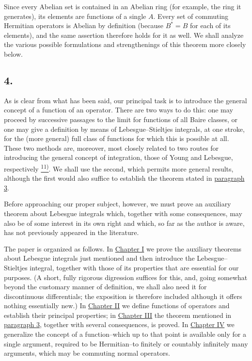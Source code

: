 \documentclass[12pt,b5paper,twoside]{article}
\newcommand{\noteref}[1]{%
  \hyperlink{note:#1}{\textsuperscript{#1)}}}
\begin{document}
Since every Abelian set is contained in an Abelian ring (for example, the ring it generates), its elements are functions of a single $A$. Every set of commuting Hermitian operators is Abelian by definition (because $B^*=B$ for each of its elements), and the same assertion therefore holds for it as well. We shall analyze the various possible formulations and strengthenings of this theorem more closely below.

\subsection*{4.}
\label{sec:intro.4}
As is clear from what has been said, our principal task is to introduce the general concept of a function of an operator. There are two ways to do this: one may proceed by successive passages to the limit for functions of all Baire classes, or one may give a definition by means of Lebesgue--Stieltjes integrals, at one stroke, for the (more general) full class of functions for which this is possible at all. These two methods are, moreover, most closely related to two routes for introducing the general concept of integration, those of Young and Lebesgue, respectively\noteref{11}. We shall use the second, which permits more general results, although the first would also suffice to establish the theorem stated in \hyperref[sec:intro.3]{paragraph 3}.

Before approaching our proper subject, however, we must prove an auxiliary theorem about Lebesgue integrals which, together with some consequences, may also be of some
interest in its own right and which, so far as the author is aware, has not previously appeared in the literature.

The paper is organized as follows. In \hyperref[sec:I]{Chapter I} we prove the auxiliary theorems about Lebesgue integrals just mentioned and then introduce the Lebesgue--Stieltjes integral, together with those of its properties that are essential for our purposes. (A short, fully rigorous digression suffices for this, and, going somewhat beyond the customary manner of definition, we shall also need it for discontinuous differentials; the exposition is therefore included although it offers nothing essentially new.) In \hyperref[sec:II]{Chapter II} we define functions of operators and establish their principal properties; in \hyperref[sec:III]{Chapter III} the theorem mentioned in \hyperref[sec:intro.3]{paragraph 3}, together with several consequences, is proved. In \hyperref[sec:IV]{Chapter IV} we generalize the concept of a function--which up to that point is available only for a single argument, required to be Hermitian--to finitely or countably infinitely many arguments, which may be commuting normal operators.
\end{document}
